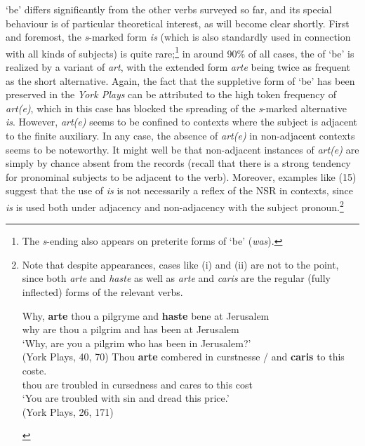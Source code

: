 \documentclass[output=paper]{langsci/langscibook}
\begin{document}
`be' differs significantly from the other verbs surveyed so far, and its
special behaviour is of particular theoretical interest, as will become clear
shortly. First and foremost, the \emph{s}-marked form \emph{is} (which is also
standardly used in connection with all kinds of \Tsg{} subjects) is quite
rare;\footnote{The \emph{s}-ending also appears on preterite forms of ‘be’
(\emph{was}).} in around 90\% of all cases, the \Ssg{} of `be' is realized
by a variant of \emph{art}, with the extended form \emph{arte} being twice
as frequent as the short alternative. Again, the fact that the suppletive
form of \Ssg{} `be' has been preserved in the \emph{York Plays} can be
attributed to the high token frequency of \emph{art(e)}, which in this case
has blocked the spreading of the \emph{s}-marked alternative \emph{is}.
However, \emph{art(e)} seems to be confined to contexts where the subject
is adjacent to the finite auxiliary. In any case, the absence of
\emph{art(e)} in non-adjacent contexts seems to be noteworthy. It
might well be that non-adjacent instances of \emph{art(e)} are simply by
chance absent from the records (recall that there is a strong tendency for
pronominal subjects to be adjacent to the verb). Moreover, examples like
(15) suggest that the use of \emph{is} is not necessarily a reflex of the
\gls{NSR} in \Ssg{} contexts, since \emph{is} is used both under adjacency
and non-adjacency with the subject pronoun.\footnote{Note that despite
    appearances, cases like (i) and (ii) are not to the point, since both
    \emph{arte} and \emph{haste} as well as \emph{arte} and \emph{caris}
    are the regular (fully inflected) \Ssg{} forms of the relevant verbs.

    \begin{exe}
        \gll Why, \textbf{arte} thou a pilgryme and \textbf{haste} bene at Jerusalem \\
        why are thou a pilgrim and has been at Jerusalem\\
        \glt `Why, are you a pilgrim who has been in Jerusalem?'\\
        (York Plays, 40, 70)
        \gll Thou \textbf{arte} combered in curstnesse / and \textbf{caris} to this coste.\\
        thou are troubled in cursedness {} and cares to this cost\\
        \glt `You are troubled with sin and dread this price.'\\
        (York Plays, 26, 171)
\end{exe}}
\end{document}
